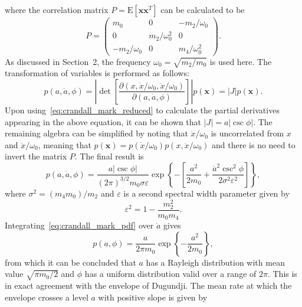\documentclass[12pt]{article}
\theoremstyle{plain}
\theoremstyle{definition}
\theoremstyle{remark}
\begin{document}
where the correlation matrix $P = \mathrm{E}[\mathbf{x} \mathbf{x}^T]$ can be calculated to be
\begin{equation}
    P = \begin{pmatrix}
        m_0 & 0 & -m_2/\omega_0 \\
        0 & m_2/\omega_0^2 & 0 \\
        -m_2/\omega_0 & 0 & m_4/\omega_0^2
    \end{pmatrix}.
    \label{eq:crandall_mark_P}
\end{equation}
As discussed in Section~2, the frequency $\omega_0 = \sqrt{m_2 / m_0}$ is used here. The transformation of variables is performed as follows:
\begin{equation}
    p(a, \dot{a}, \phi) = \left| \det \left[ \frac{\partial (x, \dot{x}/\omega_0, \ddot{x}/\omega_0)}{\partial (a, \dot{a}, \phi)} \right] \right| p(\mathbf{x}) = |J| p(\mathbf{x}).
    \label{eq:crandall_mark_jacobian}
\end{equation}
Upon using~\eqref{eq:crandall_mark_reduced} to calculate the partial derivatives appearing in the above equation, it can be shown that $|J| = a |\csc \phi|$. The remaining algebra can be simplified by noting that $\dot{x}/\omega_0$ is uncorrelated from $x$ and $\ddot{x}/\omega_0$, meaning that $p(\mathbf{x}) = p(\dot{x}/\omega_0) p(x, \ddot{x}/\omega_0)$ and there is no need to invert the matrix $P$. The final result is
\begin{equation}
    p(a, \dot{a}, \phi) = \frac{a |\csc \phi|}{(2\pi)^{3/2} m_0 \sigma \varepsilon} \exp \left\{ -\left[ \frac{a^2}{2m_0} + \frac{\dot{a}^2 \csc^2 \phi}{2 \sigma^2 \varepsilon^2} \right] \right\},
    \label{eq:crandall_mark_pdf}
\end{equation}
where $\sigma^2 = (m_4 m_0) / m_2$ and $\varepsilon$ is a second spectral width parameter given by
\begin{equation}
    \varepsilon^2 = 1 - \frac{m_2^2}{m_0 m_4}.
    \label{eq:epsilon_def}
\end{equation}
Integrating~\eqref{eq:crandall_mark_pdf} over $\dot{a}$ gives
\begin{equation}
    p(a, \phi) = \frac{a}{2\pi m_0} \exp \left\{ -\frac{a^2}{2m_0} \right\},
    \label{eq:crandall_mark_pa_phi}
\end{equation}
from which it can be concluded that $a$ has a Rayleigh distribution with mean value $\sqrt{\pi m_0 / 2}$ and $\phi$ has a uniform distribution valid over a range of $2\pi$. This is in exact agreement with the envelope of Dugundji. The mean rate at which the envelope crosses a level $a$ with positive slope is given by
\end{document}
